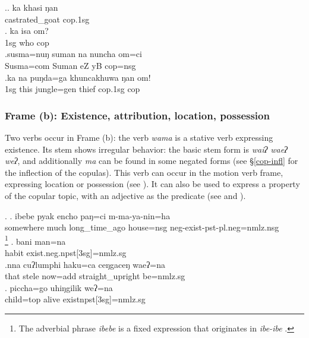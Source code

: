  \ex.\ag. ka khasi ŋan\\
	 castrated\_goat  {\sc cop.1sg} \\
	 
\bg. ka isa om?\\
{\sc 1sg} who {\sc cop}\\
\bg.susma=nuŋ    suman  na           nuncha           om=ci\\
Susma{\sc =com} Suman eZ yB {\sc cop=nsg}\\
 
\bg.ka  na   puŋda=ga    khuncakhuwa ŋan    om!\\
{\sc 1sg} this jungle{\sc =gen} thief  {\sc cop.1sg} {\sc cop}\\
 


\subsubsection{Frame (b): Existence, attribution, location, possession}

Two verbs occur in Frame (b): the verb  \emph{wama}   is a stative verb expressing existence.  Its stem shows irregular behavior: the basic stem form is \emph{waiʔ \ti waeʔ \ti weʔ}, and additionally \emph{ma} can be found in some negated forms (see §\ref{cop-infl} for the inflection of the copulas). This verb can occur in the motion verb frame, expressing location or possession (see \Next[a]). It can also be used to express a property of the copular topic, with an adjective as the predicate (see \Next[b] and \Next[c]).

	\ex. \ag. ibebe    pyak encho         paŋ=ci    m-ma-ya-nin=ha\\
somewhere much long\_time\_ago house{\sc =nsg} {\sc neg-}exist{\sc -pst-pl.neg=nmlz.nsg}\\
  \footnote{The adverbial phrase \emph{ibebe} is a fixed expression that originates in  \emph{ibe-ibe} .} 
  \bg. bani man=na\\
  habit exist{\sc .neg.npst[3sg]=nmlz.sg}		\\
	\bg.nna  cuʔlumphi haku=ca   ceŋgaceŋ       waeʔ=na\\
	that stele now{\sc =add} straight\_upright be{\sc [3sg;npst]=nmlz.sg}\\
 
\bg. piccha=go  uhiŋgilik weʔ=na\\ 
child{\sc=top} alive exist{\sc npst[3sg]=nmlz.sg}	\\ 
 	


